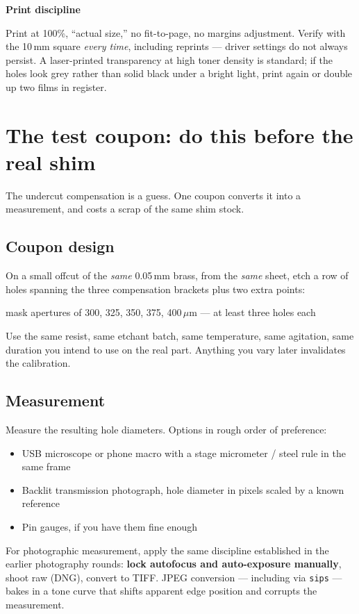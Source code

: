 \documentclass[11pt]{report}
\newenvironment{keybox}[1]%
{\par\vspace{8pt}\begin{lrbox}{\kbsave}\begin{minipage}{0.88\textwidth}%
{\bfseries\color{hbblue}#1}\par\vspace{4pt}\ignorespaces}%
{\end{minipage}\end{lrbox}%
\begin{center}\setlength{\fboxrule}{1.2pt}\setlength{\fboxsep}{8pt}%
\fcolorbox{hbblue}{boxgrey}{\usebox{\kbsave}}\end{center}\vspace{8pt}\par}
\begin{document}
\begin{keybox}{Print discipline}
Print at 100\%, ``actual size,'' no fit-to-page, no margins adjustment. Verify with the 10\,mm
square \emph{every time}, including reprints --- driver settings do not always persist. A
laser-printed transparency at high toner density is standard; if the holes look grey rather than
solid black under a bright light, print again or double up two films in register.
\end{keybox}

\chapter{The test coupon: do this before the real shim}

The undercut compensation is a guess. One coupon converts it into a measurement, and costs a
scrap of the same shim stock.

\section{Coupon design}

On a small offcut of the \emph{same} 0.05\,mm brass, from the \emph{same} sheet, etch a row of
holes spanning the three compensation brackets plus two extra points:
\begin{center}
mask apertures of 300, 325, 350, 375, 400\,$\mu$m --- at least three holes each
\end{center}
Use the same resist, same etchant batch, same temperature, same agitation, same duration you
intend to use on the real part. Anything you vary later invalidates the calibration.

\section{Measurement}

Measure the resulting hole diameters. Options in rough order of preference:
\begin{itemize}[leftmargin=1.2cm]
\item USB microscope or phone macro with a stage micrometer / steel rule in the same frame
\item Backlit transmission photograph, hole diameter in pixels scaled by a known reference
\item Pin gauges, if you have them fine enough
\end{itemize}

For photographic measurement, apply the same discipline established in the earlier photography
rounds: \textbf{lock autofocus and auto-exposure manually}, shoot raw (DNG), convert to TIFF.
JPEG conversion --- including via \texttt{sips} --- bakes in a tone curve that shifts apparent
edge position and corrupts the measurement.
\end{document}
